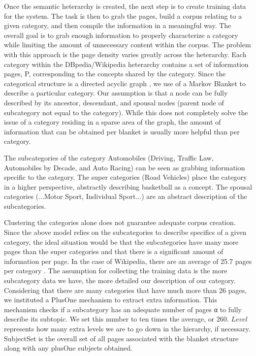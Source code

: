 Once the semantic heterarchy is created, the next step is to create
training data for the system. The task is then to grab the pages,
build a corpus relating to a given category, and then compile the
information in a meaningful way. The overall goal is to grab enough
information to properly characterize a category while limiting the
amount of unnecessary content within the corpus. The problem with this
approach is the page density varies greatly across the
heterarchy. Each category within the DBpedia/Wikipedia heterarchy
contains a set of information pages, P, corresponding to the concepts
shared by the category. Since the categorical structure is a directed
acyclic graph \cite{Suchanek07yago:a}, we use of a Markov Blanket
\cite{Friedman97bayesiannetwork} to describe a particular
category. Our assumption is that a node can be fully described by its
ancestor, descendant, and spousal nodes (parent node of subcategory
not equal to the category). While this does not completely solve the
issue of a category residing in a sparse area of the graph, the amount
of information that can be obtained per blanket is usually more
helpful than per category.


The subcategories of the category Automobiles (Driving, Traffic Law,
Automobiles by Decade, and Auto Racing) can be seen as grabbing
information specific to the category. The super categories (Road
Vehicles) place the category in a higher perspective, abstractly
describing basketball as a concept. The spousal categories
(...Motor Sport, Individual Sport...) are an abstract description of
the subcategories.


Clustering the categories alone does not guarantee adequate corpus
creation. Since the above model relies on the subcategories to
describe specifics of a given category, the ideal situation would be
that the subcategories have many more pages than the super categories
and that there is a significant amount of information per page.  In
the case of Wikipedia, there are an average of 25.7 pages per category
\cite{1321474}. The assumption for collecting the training data is the
more subcategory data we have, the more detailed our description of
our category. Considering that there are many categories that have
much more than 26 pages, we instituted a PlusOne mechanism to extract
extra information. This mechanism checks if a subcategory has an
adequate number of pages α to fully describe its subtopic. We set this
number to ten times the average, or 260. $Level$ represents how many
extra levels we are to go down in the hierarchy, if
necessary. SubjectSet is the overall set of all pages associated with
the blanket structure along with any plusOne subjects obtained.

